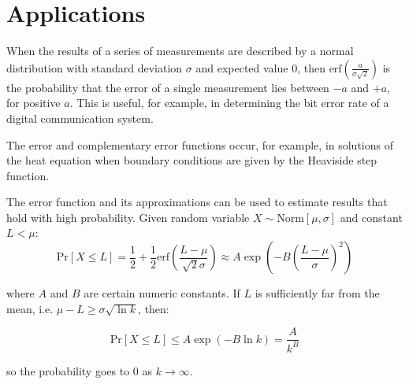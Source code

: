 \documentclass[twocolumn]{article}
\begin{document}
\section{Applications}

When the results of a series of measurements are described by a  normal distribution with standard deviation  $\sigma$ and expected value $0$, then $\mathrm{erf}\left(\frac{a}{\sigma \sqrt{2}}\right)$  is the probability that the error of a single measurement lies between $-a$ and $+a$, for positive $a$. This is useful, for example, in determining the bit error rate of a digital communication system.

The error and complementary error functions occur, for example, in solutions of the heat equation when boundary conditions are given by the Heaviside step function.

The error function and its approximations can be used to estimate results that hold with high probability. Given random variable $X \sim \mathrm{Norm}[\mu,\sigma]$ and constant $L<\mu$:
\begin{equation}
\mathrm{Pr}[X\leq L] = \frac{1}{2} + \frac{1}{2}\mathrm{erf}\left(\frac{L-\mu}{\sqrt{2}\sigma}\right) \approx A \exp \left(-B \left(\frac{L-\mu}{\sigma}\right)^2\right)
\end{equation}

where $A$ and $B$ are certain numeric constants. If $L$ is sufficiently far from the mean, i.e.   $\mu -L \geq \sigma\sqrt{\ln{k}}$, then:

\begin{equation}
\mathrm{Pr}[X\leq L] \leq A \exp (-B \ln{k}) = \frac{A}{k^B}
\end{equation}

so the probability goes to 0 as $k\rightarrow \infty$.
\end{document}
